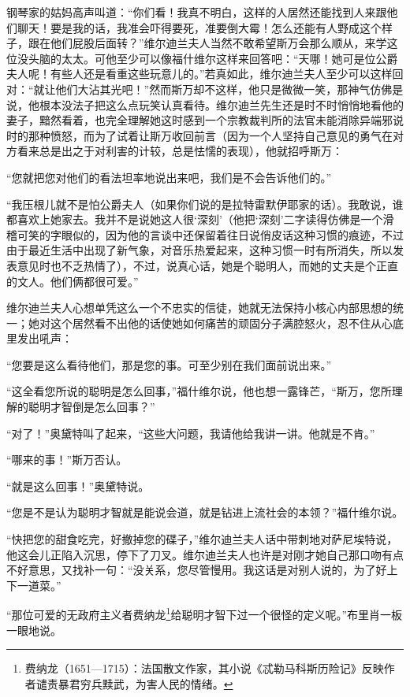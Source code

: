 \par 钢琴家的姑妈高声叫道：“你们看！我真不明白，这样的人居然还能找到人来跟他们聊天！要是我的话，我准会吓得要死，准要倒大霉！怎么还能有人野成这个样子，跟在他们屁股后面转？”维尔迪兰夫人当然不敢希望斯万会那么顺从，来学这位没头脑的太太。可他至少可以像福什维尔这样来回答吧：“天哪！她可是位公爵夫人呢！有些人还是看重这些玩意儿的。”若真如此，维尔迪兰夫人至少可以这样回对：“就让他们大沾其光吧！”然而斯万却不这样，他只是微微一笑，那神气仿佛是说，他根本没法子把这么点玩笑认真看待。维尔迪兰先生还是时不时悄悄地看他的妻子，黯然看着，也完全理解她这时感到一个宗教裁判所的法官未能消除异端邪说时的那种愤怒，而为了试着让斯万收回前言（因为一个人坚持自己意见的勇气在对方看来总是出之于对利害的计较，总是怯懦的表现），他就招呼斯万：
\par “您就把您对他们的看法坦率地说出来吧，我们是不会告诉他们的。”
\par “我压根儿就不是怕公爵夫人（如果你们说的是拉特雷默伊耶家的话）。我敢说，谁都喜欢上她家去。我并不是说她这人很‘深刻’（他把‘深刻’二字读得仿佛是一个滑稽可笑的字眼似的，因为他的言谈中还保留着往日说俏皮话这种习惯的痕迹，不过由于最近生活中出现了新气象，对音乐热爱起来，这种习惯一时有所消失，所以发表意见时也不乏热情了），不过，说真心话，她是个聪明人，而她的丈夫是个正直的文人。他们俩都很可爱。”
\par 维尔迪兰夫人心想单凭这么一个不忠实的信徒，她就无法保持小核心内部思想的统一；她对这个居然看不出他的话使她如何痛苦的顽固分子满腔怒火，忍不住从心底里发出吼声：
\par “您要是这么看待他们，那是您的事。可至少别在我们面前说出来。”
\par “这全看您所说的聪明是怎么回事，”福什维尔说，他也想一露锋芒，“斯万，您所理解的聪明才智倒是怎么回事？”
\par “对了！”奥黛特叫了起来，“这些大问题，我请他给我讲一讲。他就是不肯。”
\par “哪来的事！”斯万否认。
\par “就是这么回事！”奥黛特说。
\par “您是不是认为聪明才智就是能说会道，就是钻进上流社会的本领？”福什维尔说。
\par “快把您的甜食吃完，好撤掉您的碟子，”维尔迪兰夫人话中带刺地对萨尼埃特说，他这会儿正陷入沉思，停下了刀叉。维尔迪兰夫人也许是对刚才她自己那口吻有点不好意思，又找补一句：“没关系，您尽管慢用。我这话是对别人说的，为了好上下一道菜。”
\par “那位可爱的无政府主义者费纳龙\footnote{费纳龙（1651—1715）：法国散文作家，其小说《忒勒马科斯历险记》反映作者谴责暴君穷兵黩武，为害人民的情绪。}给聪明才智下过一个很怪的定义呢。”布里肖一板一眼地说。
